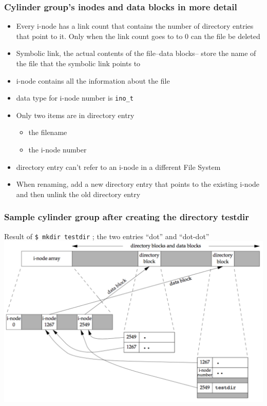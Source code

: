 \documentclass[newPxFont,sthlmFooter,nooffset]{beamer}
\begin{document}
\begin{frame}
  \frametitle{Cylinder group's inodes and data blocks in more detail}
  \begin{itemize}
  \item Every i-node has a link count that contains the number
    of directory entries that point to it. Only when the link count
    goes to to 0 can the file be deleted
  \item Symbolic link, the actual contents of the file--data blocks--
    store the name of the file that the symbolic link points to
  \item i-node contains all the information about the file
  \item data type for i-node number is \texttt{ino\_t}
  \item Only two items are in directory entry
    \begin{itemize}
    \item the filename
    \item the i-node number
    \end{itemize}
  \item directory entry can't refer to an i-node in a different File System
  \item When renaming, add a new directory entry that points to the existing i-node and then unlink the old directory entry
  \end{itemize}

\end{frame}

\begin{frame}
  \frametitle{Sample cylinder group after creating the directory testdir}
Result of \texttt{\$ mkdir testdir} ; the two entries ``dot'' and ``dot-dot''
\includegraphics[width=\textwidth]{figure/fig4_15_sample.png}
\end{frame}
\end{document}
